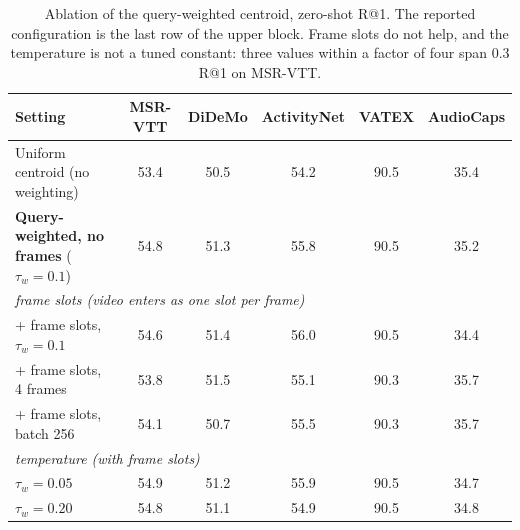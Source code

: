 \begin{table}[t]
\centering
\caption{Ablation of the query-weighted centroid, zero-shot R@1. The reported configuration
is the last row of the upper block. Frame slots do not help, and the temperature is not a
tuned constant: three values within a factor of four span 0.3 R@1 on MSR-VTT.}
\label{tab:ablation}
\small
\begin{tabular}{lccccc}
\toprule
Setting & MSR-VTT & DiDeMo & ActivityNet & VATEX & AudioCaps \\
\midrule
Uniform centroid (no weighting) & 53.4 & 50.5 & 54.2 & 90.5 & 35.4 \\
\textbf{Query-weighted, no frames} ($\tau_w{=}0.1$) & 54.8 & 51.3 & 55.8 & 90.5 & 35.2 \\
\midrule
\multicolumn{6}{l}{\emph{frame slots (video enters as one slot per frame)}} \\
\quad + frame slots, $\tau_w{=}0.1$   & 54.6 & 51.4 & 56.0 & 90.5 & 34.4 \\
\quad + frame slots, 4 frames         & 53.8 & 51.5 & 55.1 & 90.3 & 35.7 \\
\quad + frame slots, batch 256        & 54.1 & 50.7 & 55.5 & 90.3 & 35.7 \\
\midrule
\multicolumn{6}{l}{\emph{temperature (with frame slots)}} \\
\quad $\tau_w = 0.05$ & 54.9 & 51.2 & 55.9 & 90.5 & 34.7 \\
\quad $\tau_w = 0.20$ & 54.8 & 51.1 & 54.9 & 90.5 & 34.8 \\
\bottomrule
\end{tabular}
\end{table}
